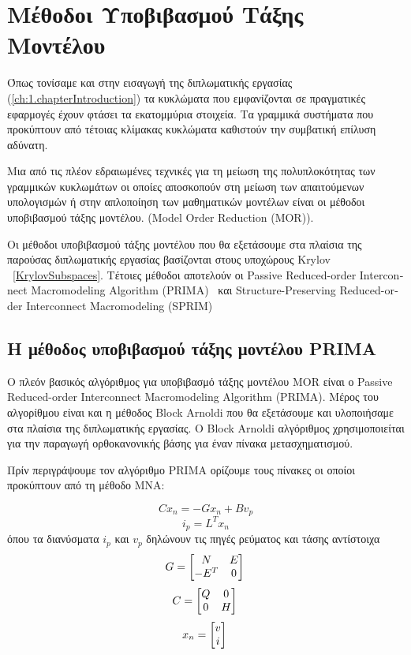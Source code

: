 ﻿
\chapter{Μέθοδοι Υποβιβασμού Τάξης Μοντέλου}
\label{ch:4.chapterMOR}

Όπως τονίσαμε και στην εισαγωγή της διπλωματικής εργασίας (\ref{ch:1.chapterIntroduction}) τα κυκλώματα που εμφανίζονται σε πραγματικές εφαρμογές έχουν φτάσει τα εκατομμύρια στοιχεία. Τα γραμμικά συστήματα που προκύπτουν από τέτοιας κλίμακας κυκλώματα καθιστούν την συμβατική επίλυση αδύνατη.

Μια από τις πλέον εδραιωμένες τεχνικές για τη μείωση της πολυπλοκότητας των γραμμικών κυκλωμάτων οι οποίες αποσκοπούν στη μείωση των απαιτούμενων υπολογισμών ή στην απλοποίηση των μαθηματικών μοντέλων είναι οι μέθοδοι υποβιβασμού τάξης μοντέλου. (\textlatin{Model Order Reduction (MOR)}).

Οι μέθοδοι υποβιβασμού τάξης μοντέλου που θα εξετάσουμε στα πλαίσια της παρούσας διπλωματικής εργασίας βασίζονται στους υποχώρους \textlatin{Krylov} ~\ref{KrylovSubspaces}. Τέτοιες μέθοδοι αποτελούν οι \textlatin{Passive Reduced-order Interconnect Macromodeling Algorithm (PRIMA)}~\cite{odabasioglu2003prima} και \textlatin{ Structure-Preserving Reduced-order Interconnect Macromodeling (SPRIM)} ~\cite{freund2004sprim}


\section{Η μέθοδος υποβιβασμού τάξης μοντέλου \textlatin{PRIMA}}

Ο πλεόν βασικός αλγόριθμος για υποβιβασμό τάξης μοντέλου \textlatin{MOR} είναι ο \textlatin{Passive Reduced-order Interconnect Macromodeling Algorithm (PRIMA)}. Μέρος του αλγορίθμου είναι και η μέθοδος \textlatin{Block Arnoldi} που θα εξετάσουμε και υλοποιήσαμε στα πλαίσια της διπλωματικής εργασίας. O \textlatin{Block Arnoldi} αλγόριθμος χρησιμοποιείται για την παραγωγή ορθοκανονικής βάσης για έναν πίνακα μετασχηματισμού.

Πρίν περιγράψουμε τον αλγόριθμο \textlatin{PRIMA} ορίζουμε τους πίνακες οι οποίοι προκύπτουν από τη μέθοδο \textlatin{MNA}:

\begin{equation} \label{Cxn}
    C x_n = -G x_n + B v_p
\end{equation}
\[
    i_p = L^T x_n
\]
όπου τα διανύσματα $i_p$ και $v_p$ δηλώνουν τις πηγές ρεύματος και τάσης αντίστοιχα
\[
    G = 
    \begin{bmatrix}
    N & E \\
    -E^T & 0
    \end{bmatrix}\\
\]
\[
    C = 
    \begin{bmatrix}
    Q & 0 \\
    0 & H
    \end{bmatrix}\\
\]
\[
    x_n = 
    \begin{bmatrix}
    v \\
    i
    \end{bmatrix}\\
\]

